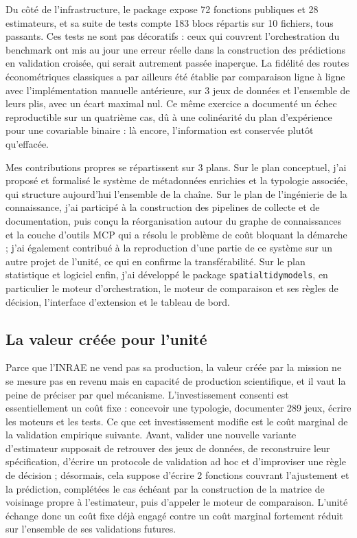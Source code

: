 \documentclass[11pt,a4paper]{article}
\begin{document}
Du côté de l'infrastructure, le package expose 72 fonctions publiques et 28 estimateurs, et sa suite de tests compte 183 blocs répartis sur 10 fichiers, tous passants. Ces tests ne sont pas décoratifs : ceux qui couvrent l'orchestration du benchmark ont mis au jour une erreur réelle dans la construction des prédictions en validation croisée, qui serait autrement passée inaperçue. La fidélité des routes économétriques classiques a par ailleurs été établie par comparaison ligne à ligne avec l'implémentation manuelle antérieure, sur 3 jeux de données et l'ensemble de leurs plis, avec un écart maximal nul. Ce même exercice a documenté un échec reproductible sur un quatrième cas, dû à une colinéarité du plan d'expérience pour une covariable binaire : là encore, l'information est conservée plutôt qu'effacée.

Mes contributions propres se répartissent sur 3 plans. Sur le plan conceptuel, j'ai proposé et formalisé le système de métadonnées enrichies et la typologie associée, qui structure aujourd'hui l'ensemble de la chaîne. Sur le plan de l'ingénierie de la connaissance, j'ai participé à la construction des pipelines de collecte et de documentation, puis conçu la réorganisation autour du graphe de connaissances et la couche d'outils MCP qui a résolu le problème de coût bloquant la démarche ; j'ai également contribué à la reproduction d'une partie de ce système sur un autre projet de l'unité, ce qui en confirme la transférabilité. Sur le plan statistique et logiciel enfin, j'ai développé le package \texttt{spatialtidymodels}, en particulier le moteur d'orchestration, le moteur de comparaison et ses règles de décision, l'interface d'extension et le tableau de bord.

\subsection{La valeur créée pour l'unité}

Parce que l'INRAE ne vend pas sa production, la valeur créée par la mission ne se mesure pas en revenu mais en capacité de production scientifique, et il vaut la peine de préciser par quel mécanisme. L'investissement consenti est essentiellement un coût fixe : concevoir une typologie, documenter 289 jeux, écrire les moteurs et les tests. Ce que cet investissement modifie est le coût marginal de la validation empirique suivante. Avant, valider une nouvelle variante d'estimateur supposait de retrouver des jeux de données, de reconstruire leur spécification, d'écrire un protocole de validation ad hoc et d'improviser une règle de décision ; désormais, cela suppose d'écrire 2 fonctions couvrant l'ajustement et la prédiction, complétées le cas échéant par la construction de la matrice de voisinage propre à l'estimateur, puis d'appeler le moteur de comparaison. L'unité échange donc un coût fixe déjà engagé contre un coût marginal fortement réduit sur l'ensemble de ses validations futures.
\end{document}
